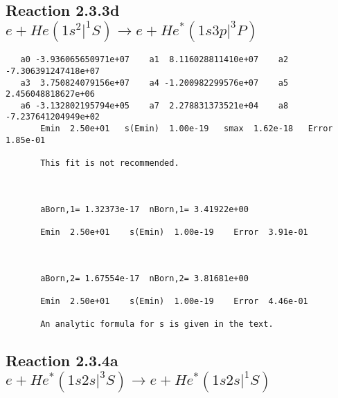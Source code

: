 \documentclass[12pt]{article}
\begin{document}
\newpage
\subsection{
Reaction 2.3.3d $e + He(1s^2|^1S) \rightarrow e + He^*(1s3p|^3P)$}

















\begin{small}\begin{verbatim}
   a0 -3.936065650971e+07    a1  8.116028811410e+07    a2 -7.306391247418e+07
   a3  3.750824079156e+07    a4 -1.200982299576e+07    a5  2.456048818627e+06
   a6 -3.132802195794e+05    a7  2.278831373521e+04    a8 -7.237641204949e+02
       Emin  2.50e+01   s(Emin)  1.00e-19   smax  1.62e-18   Error  1.85e-01

       This fit is not recommended.



       aBorn,1= 1.32373e-17  nBorn,1= 3.41922e+00 

       Emin  2.50e+01    s(Emin)  1.00e-19    Error  3.91e-01



       aBorn,2= 1.67554e-17  nBorn,2= 3.81681e+00

       Emin  2.50e+01    s(Emin)  1.00e-19    Error  4.46e-01

       An analytic formula for s is given in the text.
\end{verbatim}\end{small}




\newpage
\subsection{
Reaction 2.3.4a $e + He^*(1s2s|^3S) \rightarrow e + He^*(1s2s|^1S)$}






\end{document}
